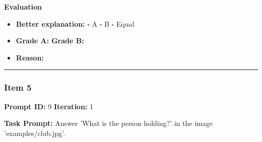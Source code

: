 \documentclass[11pt]{article}
\begin{document}
\vspace{1em}

\textbf{Evaluation}
\begin{itemize}
    \item \textbf{Better explanation:} \hspace{1em} $\square$ A \hspace{1em} $\square$ B \hspace{1em} $\square$ Equal
    \item \textbf{Grade A:} \underline{\hspace{2cm}} \hspace{1em} \textbf{Grade B:} \underline{\hspace{2cm}}
    \item \textbf{Reason:} \\[4.5em]
\end{itemize}

\vspace{1em}
\hrule
\vspace{1em}


\subsubsection*{Item 5}
\textbf{Prompt ID:} 9 \hfill \textbf{Iteration:} 1

\textbf{Task Prompt:} Answer 'What is the person holding?' in the image 'examples/club.jpg'.
\end{document}
